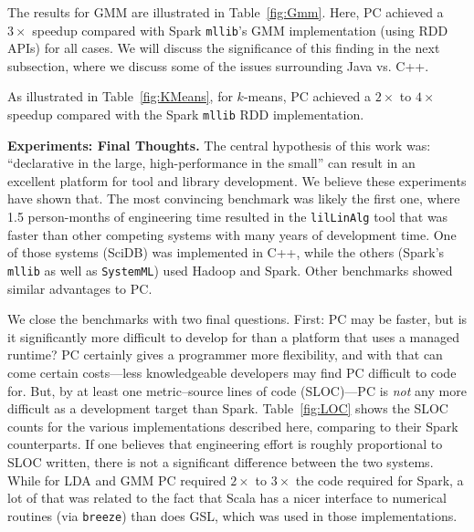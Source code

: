 The results for GMM are illustrated in Table~\ref{fig:Gmm}. Here, PC achieved a 
$3\times$ speedup compared with Spark \texttt{mllib}'s GMM implementation
(using RDD APIs) for all cases.  We will discuss the significance of this finding in the next subsection, where we discuss
some of the issues surrounding Java vs. C++. 

As illustrated in Table~\ref{fig:KMeans}, for $k$-means, PC achieved a $2\times$ to
$4\times$ speedup compared with the Spark \texttt{mllib} RDD implementation. 





\vspace{5pt}
\noindent
\textbf{Experiments: Final Thoughts.} The central hypothesis of this
work was: ``declarative in the large, high-performance in the small'' can result
in an excellent platform for tool and library development.  We believe these experiments have shown that.  The
most convincing benchmark was likely the first one, where 1.5
person-months of engineering time resulted in the \texttt{lilLinAlg} tool that 
was faster than other competing systems with many years of development time.  One of those systems (SciDB)
was implemented in C++, while the others (Spark's \texttt{mllib} as well as \texttt{SystemML}) used Hadoop and Spark.  
Other benchmarks showed similar advantages to PC.

We close the benchmarks with two final questions.  First: PC may be faster, but is it significantly more difficult to develop
for than a platform that uses a managed runtime?  PC certainly gives a programmer more flexibility, and with that can come
certain costs---less knowledgeable developers may find PC difficult to code for.  But, by at least one metric--source
lines of code (SLOC)---PC is \emph{not}
any more difficult as a development target than Spark.
Table~\ref{fig:LOC} shows the SLOC counts for the various implementations described here, comparing to their Spark counterparts.
If one believes that engineering effort is roughly proportional to SLOC written, there is not a significant
difference between the two
systems.  
While for LDA and GMM PC required $2\times$ to $3\times$ the code required for Spark, a lot of that was related
to the fact that Scala has a nicer interface to numerical routines (via \texttt{breeze}) 
than does GSL, which was used in those
implementations.



